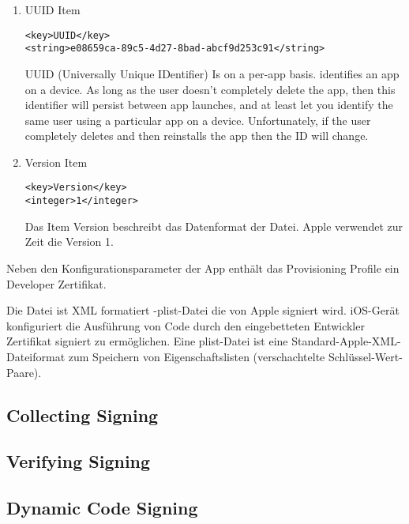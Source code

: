 \begin{enumerate}
    \item UUID Item
\begin{lstlisting}[caption={UUID Item}]
<key>UUID</key>
<string>e08659ca-89c5-4d27-8bad-abcf9d253c91</string>
\end{lstlisting}
UUID (Universally Unique IDentifier) Is on a per-app basis. identifies an app on a device. As long as the user doesn’t completely delete the app, then this identifier will persist between app launches, and at least let you identify the same user using a particular app on a device. Unfortunately, if the user completely deletes and then reinstalls the app then the ID will change.

    \item Version Item
\begin{lstlisting}[caption={Version Item}]
<key>Version</key>
<integer>1</integer> 
\end{lstlisting}
Das Item Version beschreibt das Datenformat der Datei. Apple verwendet zur Zeit die Version 1.    
\end{enumerate}


Neben den Konfigurationsparameter der App enthält das \glqq Provisioning Profile\grqq{} ein \glqq Developer Zertifikat\grqq.
 

 
 Die Datei ist XML formatiert -plist-Datei die von Apple signiert wird. iOS-Gerät konfiguriert die Ausführung von Code durch den eingebetteten Entwickler Zertifikat signiert zu ermöglichen. Eine plist-Datei ist eine Standard-Apple-XML-Dateiformat zum Speichern von Eigenschaftslisten (verschachtelte Schlüssel-Wert-Paare).

\subsection{Collecting Signing}
\label{sec:CollectingSigning}



\subsection{Verifying Signing}
\label{sec:VerifyingSigning}


\subsection{Dynamic Code Signing}
\label{sec:DynamicCodeSigning}

